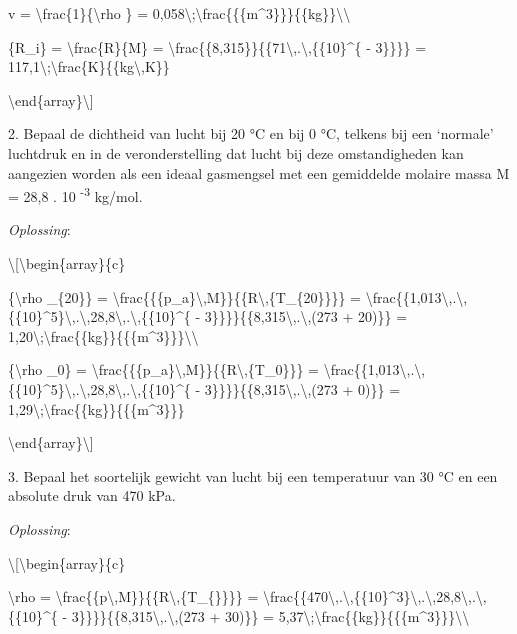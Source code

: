 \documentclass[]{article}
\begin{document}
v = \textbackslash{}frac\{1\}\{\textbackslash{}rho \} =
0,058\textbackslash{};\textbackslash{}frac\{\{\{m\^{}3\}\}\}\{\{kg\}\}\textbackslash{}\textbackslash{}

\{R\_i\} = \textbackslash{}frac\{R\}\{M\} =
\textbackslash{}frac\{\{8,315\}\}\{\{71\textbackslash{},.\textbackslash{},\{\{10\}\^{}\{
- 3\}\}\}\} =
117,1\textbackslash{};\textbackslash{}frac\{K\}\{\{kg\textbackslash{},K\}\}

\textbackslash{}end\{array\}\textbackslash{}{]}

2. Bepaal de dichtheid van lucht bij 20 °C en bij 0 °C, telkens bij een
`normale' luchtdruk en in de veronderstelling dat lucht bij deze
omstandigheden kan aangezien worden als een ideaal gasmengsel met een
gemiddelde molaire massa M = 28,8 . 10 \textsuperscript{-3} kg/mol.

\emph{Oplossing}:

\textbackslash{}{[}\textbackslash{}begin\{array\}\{c\}

\{\textbackslash{}rho \_\{20\}\} =
\textbackslash{}frac\{\{\{p\_a\}\textbackslash{},M\}\}\{\{R\textbackslash{},\{T\_\{20\}\}\}\}
=
\textbackslash{}frac\{\{1,013\textbackslash{},.\textbackslash{},\{\{10\}\^{}5\}\textbackslash{},.\textbackslash{},28,8\textbackslash{},.\textbackslash{},\{\{10\}\^{}\{
- 3\}\}\}\}\{\{8,315\textbackslash{},.\textbackslash{},(273 + 20)\}\} =
1,20\textbackslash{};\textbackslash{}frac\{\{kg\}\}\{\{\{m\^{}3\}\}\}\textbackslash{}\textbackslash{}

\{\textbackslash{}rho \_0\} =
\textbackslash{}frac\{\{\{p\_a\}\textbackslash{},M\}\}\{\{R\textbackslash{},\{T\_0\}\}\}
=
\textbackslash{}frac\{\{1,013\textbackslash{},.\textbackslash{},\{\{10\}\^{}5\}\textbackslash{},.\textbackslash{},28,8\textbackslash{},.\textbackslash{},\{\{10\}\^{}\{
- 3\}\}\}\}\{\{8,315\textbackslash{},.\textbackslash{},(273 + 0)\}\} =
1,29\textbackslash{};\textbackslash{}frac\{\{kg\}\}\{\{\{m\^{}3\}\}\}

\textbackslash{}end\{array\}\textbackslash{}{]}

3. Bepaal het soortelijk gewicht van lucht bij een temperatuur van 30 °C
en een absolute druk van 470 kPa.

\emph{Oplossing}:

\textbackslash{}{[}\textbackslash{}begin\{array\}\{c\}

\textbackslash{}rho =
\textbackslash{}frac\{\{p\textbackslash{},M\}\}\{\{R\textbackslash{},\{T\_\{\}\}\}\}
=
\textbackslash{}frac\{\{470\textbackslash{},.\textbackslash{},\{\{10\}\^{}3\}\textbackslash{},.\textbackslash{},28,8\textbackslash{},.\textbackslash{},\{\{10\}\^{}\{
- 3\}\}\}\}\{\{8,315\textbackslash{},.\textbackslash{},(273 + 30)\}\} =
5,37\textbackslash{};\textbackslash{}frac\{\{kg\}\}\{\{\{m\^{}3\}\}\}\textbackslash{}\textbackslash{}
\end{document}
